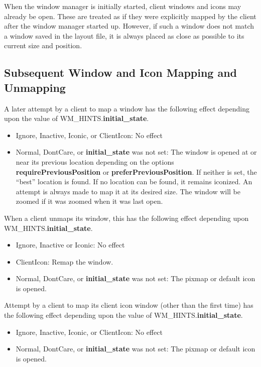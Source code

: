 When the window manager is initially started, client windows and icons
may already be open.  These are treated as if they were explicitly mapped
by the client after the window manager started up.  However, if such a
window does not match a window saved in the layout file, it is always
placed as close as possible to its current size and position.

\subsection{Subsequent Window and Icon Mapping and Unmapping}

A later attempt by a client to map a window has the following
effect depending upon the value of {\sc WM\_HINTS}.{\bf initial\_state}.

\begin{itemize}
\item Ignore, Inactive, Iconic, or ClientIcon: No effect

\item Normal, DontCare, or {\bf initial\_state} was not set: The window is
opened at or near its previous location depending on the
options {\bf requirePreviousPosition} or {\bf preferPreviousPosition}.
If neither is set, the ``best'' location is found.
If no location can be found, it remains iconized.
An attempt is always made to map it at its desired size.
The window will be zoomed if it was zoomed when it was last open.
\end{itemize}

When a client unmaps its window, this has the following effect depending
upon \\ {\sc WM\_HINTS}.{\bf initial\_state}.

\begin{itemize}
\item Ignore, Inactive or Iconic: No effect

\item ClientIcon: Remap the window.

\item Normal, DontCare, or {\bf initial\_state} was not set: The
pixmap or default icon is opened.
\end{itemize}

Attempt by a client to map its client icon window (other than the
first time) has the following effect depending upon the value of
{\sc WM\_HINTS}.{\bf initial\_state}.

\begin{itemize}
\item Ignore, Inactive, Iconic, or ClientIcon: No effect

\item Normal, DontCare, or {\bf initial\_state} was not set: The
pixmap or default icon is opened.
\end{itemize}

